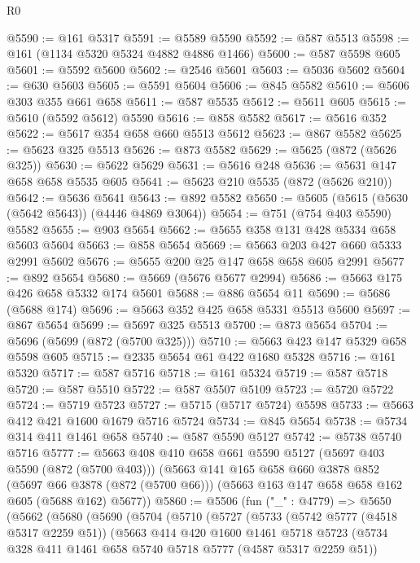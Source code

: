 \begin{lexlean}{R0}
\begin{coremodule}
@5590 := @161 @5317
@5591 := @5589 @5590
@5592 := @587 @5513
@5598 := @161 (@1134 @5320 @5324 @4882 @4886 @1466)
@5600 := @587 @5598 @605
@5601 := @5592 @5600
@5602 := @2546 @5601
@5603 := @5036 @5602
@5604 := @630 @5603
@5605 := @5591 @5604
@5606 := @845 @5582
@5610 := @5606 @303 @355 @661 @658
@5611 := @587 @5535
@5612 := @5611 @605
@5615 := @5610 (@5592 @5612) @5590
@5616 := @858 @5582
@5617 := @5616 @352
@5622 := @5617 @354 @658 @660 @5513 @5612
@5623 := @867 @5582
@5625 := @5623 @325 @5513
@5626 := @873 @5582
@5629 := @5625 (@872 (@5626 @325))
@5630 := @5622 @5629
@5631 := @5616 @248
@5636 := @5631 @147 @658 @658 @5535 @605
@5641 := @5623 @210 @5535 (@872 (@5626 @210))
@5642 := @5636 @5641
@5643 := @892 @5582
@5650 := @5605 (@5615 (@5630 (@5642 @5643)) (@4446 @4869 @3064))
@5654 := @751 (@754 @403 @5590) @5582
@5655 := @903 @5654
@5662 := @5655 @358 @131 @428 @5334 @658 @5603 @5604
@5663 := @858 @5654
@5669 := @5663 @203 @427 @660 @5333 @2991 @5602
@5676 := @5655 @200 @25 @147 @658 @658 @605 @2991
@5677 := @892 @5654
@5680 := @5669 (@5676 @5677 @2994)
@5686 := @5663 @175 @426 @658 @5332 @174 @5601
@5688 := @886 @5654 @11
@5690 := @5686 (@5688 @174)
@5696 := @5663 @352 @425 @658 @5331 @5513 @5600
@5697 := @867 @5654
@5699 := @5697 @325 @5513
@5700 := @873 @5654
@5704 := @5696 (@5699 (@872 (@5700 @325)))
@5710 := @5663 @423 @147 @5329 @658 @5598 @605
@5715 := @2335 @5654 @61 @422 @1680 @5328
@5716 := @161 @5320
@5717 := @587 @5716
@5718 := @161 @5324
@5719 := @587 @5718
@5720 := @587 @5510
@5722 := @587 @5507 @5109
@5723 := @5720 @5722
@5724 := @5719 @5723
@5727 := @5715 (@5717 @5724) @5598
@5733 := @5663 @412 @421 @1600 @1679 @5716 @5724
@5734 := @845 @5654
@5738 := @5734 @314 @411 @1461 @658
@5740 := @587 @5590 @5127
@5742 := @5738 @5740 @5716
@5777 := @5663
    @408
    @410
    @658
    @661
    @5590
    @5127
    (@5697 @403 @5590 (@872 (@5700 @403)))
    (@5663
      @141
      @165
      @658
      @660
      @3878
      @852
      (@5697 @66 @3878 (@872 (@5700 @66)))
      (@5663 @163 @147 @658 @658 @162 @605 (@5688 @162) @5677))
@5860 := @5506
    (fun ("_" : @4779) =>
    @5650
      (@5662
        (@5680
          (@5690
            (@5704
              (@5710
                (@5727
                  (@5733
                    (@5742 @5777 (@4518 @5317 @2259 @51))
                    (@5663
                      @414
                      @420
                      @1600
                      @1461
                      @5718
                      @5723
                      (@5734 @328 @411 @1461 @658 @5740 @5718 @5777 (@4587 @5317 @2259 @51))

\end{coremodule}
\end{lexlean}
